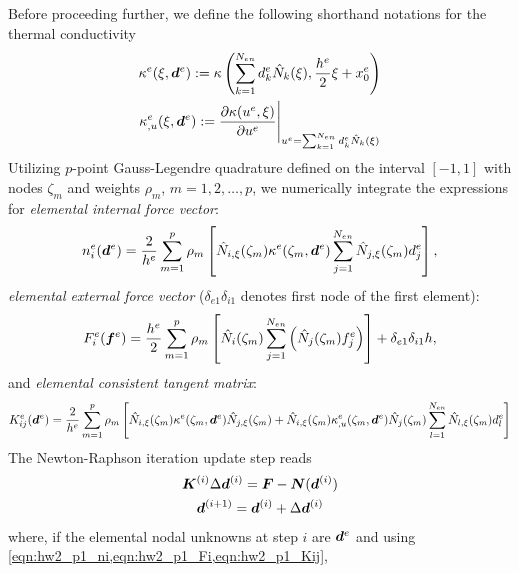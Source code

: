 Before proceeding further, we define the following shorthand notations for the thermal conductivity 
\begin{equation}
\begin{gathered}
    \kappa^e(\xi, \bm{d}^e):= \kappa\left(\sum_{k=1}^{N_{en}} d_k^e \hat{N}_k(\xi), \frac{h^e}{2}\xi + x_0^e\right) \\
    \kappa_{,u}^e(\xi, \bm{d}^e):= \frac{\partial \kappa(u^e, \xi)}{\partial u^e} \Bigg|_{u^e = \sum_{k=1}^{N_{en}} d_k^e \hat{N}_k(\xi)}
\end{gathered}
\end{equation}
Utilizing $p$-point Gauss-Legendre quadrature defined on the interval $[-1, 1]$ with nodes $\zeta_m$ and weights $\rho_m$, $m = 1, 2, \ldots, p$, we numerically integrate the expressions for \emph{elemental internal force vector}:
\begin{equation}\label{eqn:hw2_p1_ni}
    n_i^e(\bm{d}^e) = \frac{2}{h^e} \sum_{m=1}^p \rho_m \left[\hat{N}_{i,\xi}(\zeta_m) \kappa^e(\zeta_m, \bm{d}^e) \sum_{j=1}^{N_{en}} \hat{N}_{j,\xi}(\zeta_m) d_j^e\right],
\end{equation}
\emph{elemental external force vector} ($\delta_{e1}\delta_{i1}$ denotes first node of the first element):
\begin{equation}\label{eqn:hw2_p1_Fi}
    F_i^e(\bm{f}^e) = \frac{h^e}{2} \sum_{m=1}^p \rho_m \left[\hat{N}_{i}(\zeta_m) \sum_{j=1}^{N_{en}} \left(\hat{N}_{j}(\zeta_m) f_j^e\right) \right] + \delta_{e1}\delta_{i1}h,
\end{equation}
and \emph{elemental consistent tangent matrix}:
\begin{equation}\label{eqn:hw2_p1_Kij}
    K_{ij}^e(\bm{d}^e) = \frac{2}{h^e} \sum_{m=1}^p \rho_m \left[ 
        \hat{N}_{i,\xi}(\zeta_m) \kappa^e(\zeta_m, \bm{d}^e) \hat{N}_{j,\xi}(\zeta_m) + 
        \hat{N}_{i,\xi}(\zeta_m) \kappa_{,u}^e(\zeta_m, \bm{d}^e) \hat{N}_j(\zeta_m) \sum_{l=1}^{N_{en}} \hat{N}_{l,\xi}(\zeta_m)d_l^e \right]
\end{equation}
The Newton-Raphson iteration update step reads 
\begin{equation}\label{eqn:hw2_p1_nr}
\begin{gathered}
    \bm{K}^{(i)} \Delta \bm{d}^{(i)} =  \bm{F} - \bm{N}(\bm{d}^{(i)}) \\
    \bm{d}^{(i+1)} = \bm{d}^{(i)} + \Delta \bm{d}^{(i)}
\end{gathered}
\end{equation}
where, if the elemental nodal unknowns at step $i$ are $\bm{d}^e$ and using \cref{eqn:hw2_p1_ni,eqn:hw2_p1_Fi,eqn:hw2_p1_Kij}, 
